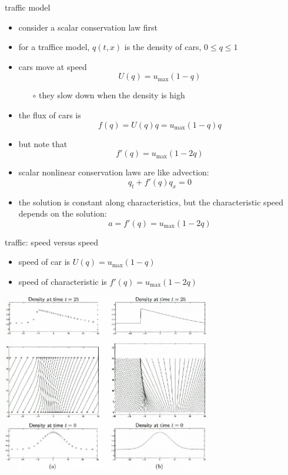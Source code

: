 \documentclass[10pt,hyperref,dvipsnames]{beamer}
\begin{document}
\begin{frame}{traffic model}

\begin{itemize}
\item consider a scalar conservation law first
\item for a traffice model, $q(t,x)$ is the density of cars, $0\le q \le 1$
\item cars move at speed
    $$U(q) = u_{\max} (1-q)$$

    \begin{itemize}
    \item[$\circ$] they slow down when the density is high
    \end{itemize}
\item the flux of cars is
    $$f(q) = U(q) q = u_{\max} (1-q) q$$
\item but note that
    $$f'(q) = u_{\max} (1-2q)$$
\item scalar nonlinear conservation laws are like advection:
    $$q_t + f'(q) q_x = 0$$
\item the solution is constant along characteristics, but the characteristic speed depends on the solution:
    $$a = f'(q) = u_{\max} (1-2q)$$
\end{itemize}
\end{frame}


\begin{frame}{traffic: speed versus speed}

\begin{itemize}
\item speed of car is $U(q) = u_{\max} (1-q)$
\item speed of characteristic is $f'(q) = u_{\max} (1-2q)$
\end{itemize}

\begin{center}
\includegraphics[width=0.68\textwidth]{figs/leveque11p1}
\end{center}
\end{frame}
\end{document}
